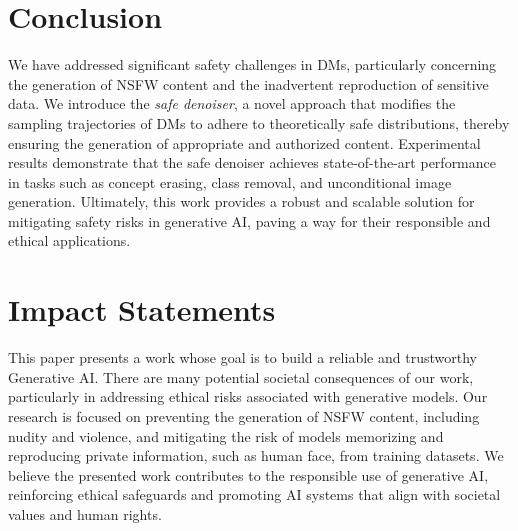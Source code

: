 \section{Conclusion}
\label{sec_conclusion}
We have addressed significant safety challenges in DMs, particularly concerning the generation of NSFW content and the inadvertent reproduction of sensitive data. We introduce the \textit{safe denoiser}, a novel approach that modifies the sampling trajectories of DMs to adhere to theoretically safe distributions, thereby ensuring the generation of appropriate and authorized content. Experimental results demonstrate that the safe denoiser achieves state-of-the-art performance in tasks such as concept erasing, class removal, and unconditional image generation. Ultimately, this work provides a robust and scalable solution for mitigating safety risks in generative AI, paving a way for their responsible and ethical applications.
%

\section*{Impact Statements}

This paper presents a work whose goal is to build a reliable and trustworthy Generative AI. There are many potential societal consequences of our work, particularly in addressing ethical risks associated with generative models. Our research is focused on preventing the generation of NSFW content, including nudity and violence, and mitigating the risk of models memorizing and reproducing private information, such as human face, from training datasets. We believe the presented work  contributes to the responsible use of generative AI, reinforcing ethical safeguards and promoting AI systems that align with societal values and human rights.

%

%




%

